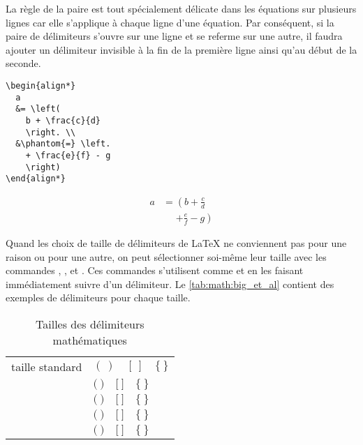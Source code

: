 La règle de la paire est tout spécialement délicate dans les équations
sur plusieurs lignes car elle s'applique à chaque ligne d'une
équation. Par conséquent, si la paire de délimiteurs s'ouvre sur une
ligne et se referme sur une autre, il faudra ajouter un délimiteur
invisible à la fin de la première ligne ainsi qu'au début de la
seconde.
\begin{demo}
  \begin{texample}
\begin{lstlisting}
\begin{align*}
  a
  &= \left(
    b + \frac{c}{d}
    \right. \\
  &\phantom{=} \left.
    + \frac{e}{f} - g
    \right)
\end{align*}
\end{lstlisting}
    \producing
    \begin{align*}
      a
      &= \left(
        b + \frac{c}{d}
        \right. \\
      &\phantom{=} \left.
        + \frac{e}{f} - g
        \right)
    \end{align*}
  \end{texample}
\end{demo}

Quand les choix de taille de délimiteurs de {\LaTeX} ne conviennent
pas pour une raison ou pour une autre, on peut sélectionner soi-même
leur taille avec les commandes %
\cmd{\big}, %
\cmd{\Big}, %
\cmd{\bigg} et %
\cmd{\Bigg}. %
Ces commandes s'utilisent comme \cmdprint{\left} et \cmdprint{\right}
en les faisant immédiatement suivre d'un délimiteur. Le
\autoref{tab:math:big_et_al} contient des exemples de délimiteurs pour
chaque taille.

\begin{table}
  \centering
  \caption{Tailles des délimiteurs mathématiques}
  \label{tab:math:big_et_al}
  \begin{tabular}{ll}
    taille standard & $(~) \quad [~] \quad \{~\}$ \\
    \addlinespace[6pt]
    \cmd{\big} & $\big(~\big) \quad \big[~\big] \quad \big\{~\big\}$ \\
    \addlinespace[6pt]
    \cmd{\Big} & $\Big(~\Big) \quad \Big[~\Big] \quad \Big\{~\Big\}$ \\
    \addlinespace[6pt]
    \cmd{\bigg} & $\bigg(~\bigg) \quad \bigg[~\bigg] \quad \bigg\{~\bigg\}$ \\
    \addlinespace[6pt]
    \cmd{\Bigg} & $\Bigg(~\Bigg) \quad \Bigg[~\Bigg] \quad \Bigg\{~\Bigg\}$ \\
  \end{tabular}
\end{table}

